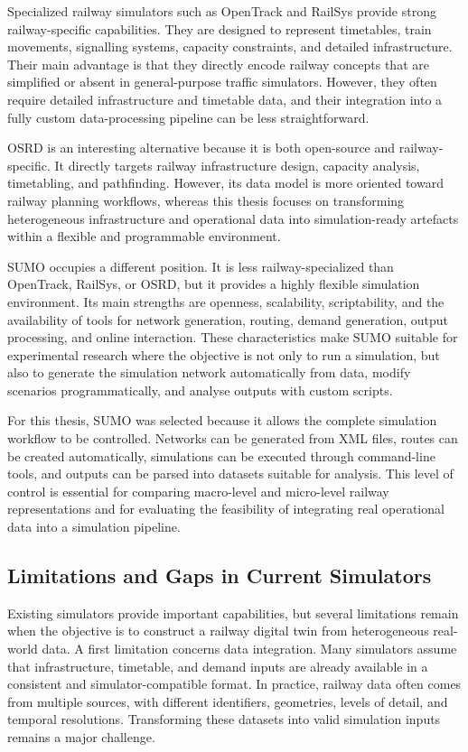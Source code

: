 Specialized railway simulators such as OpenTrack and RailSys provide strong railway-specific capabilities. They are 
designed to represent timetables, train movements, signalling systems, capacity constraints, and detailed infrastructure. 
Their main advantage is that they directly encode railway concepts that are simplified or absent in general-purpose traffic 
simulators. However, they often require detailed infrastructure and timetable data, and their integration into a fully 
custom data-processing pipeline can be less straightforward.

OSRD is an interesting alternative because it is both open-source and railway-specific. It directly targets railway 
infrastructure design, capacity analysis, timetabling, and pathfinding. However, its data model is more oriented toward 
railway planning workflows, whereas this thesis focuses on transforming heterogeneous infrastructure and operational data 
into simulation-ready artefacts within a flexible and programmable environment.

SUMO occupies a different position. It is less railway-specialized than OpenTrack, RailSys, or OSRD, but it provides a 
highly flexible simulation environment. Its main strengths are openness, scalability, scriptability, and the availability 
of tools for network generation, routing, demand generation, output processing, and online interaction. These 
characteristics make SUMO suitable for experimental research where the objective is not only to run a simulation, but also 
to generate the simulation network automatically from data, modify scenarios programmatically, and analyse outputs with 
custom scripts.

For this thesis, SUMO was selected because it allows the complete simulation workflow to be controlled. Networks can be 
generated from XML files, routes can be created automatically, simulations can be executed through command-line tools, and 
outputs can be parsed into datasets suitable for analysis. This level of control is essential for comparing macro-level 
and micro-level railway representations and for evaluating the feasibility of integrating real operational data into a 
simulation pipeline.


\subsection{Limitations and Gaps in Current Simulators}
Existing simulators provide important capabilities, but several limitations remain when the objective is to construct a 
railway digital twin from heterogeneous real-world data. A first limitation concerns data integration. Many simulators 
assume that infrastructure, timetable, and demand inputs are already available in a consistent and simulator-compatible 
format. In practice, railway data often comes from multiple sources, with different identifiers, geometries, levels of 
detail, and temporal resolutions. Transforming these datasets into valid simulation inputs remains a major challenge.

